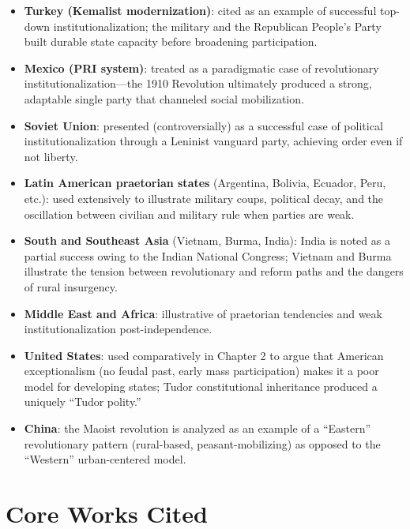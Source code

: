 \documentclass[12pt]{article}
\begin{document}
\begin{itemize}[leftmargin=*, itemsep=4pt]
    \item \textbf{Turkey (Kemalist modernization)}: cited as an example of successful top-down institutionalization; the military and the Republican People's Party built durable state capacity before broadening participation.
    \item \textbf{Mexico (PRI system)}: treated as a paradigmatic case of revolutionary institutionalization---the 1910 Revolution ultimately produced a strong, adaptable single party that channeled social mobilization.
    \item \textbf{Soviet Union}: presented (controversially) as a successful case of political institutionalization through a Leninist vanguard party, achieving order even if not liberty.
    \item \textbf{Latin American praetorian states} (Argentina, Bolivia, Ecuador, Peru, etc.): used extensively to illustrate military coups, political decay, and the oscillation between civilian and military rule when parties are weak.
    \item \textbf{South and Southeast Asia} (Vietnam, Burma, India): India is noted as a partial success owing to the Indian National Congress; Vietnam and Burma illustrate the tension between revolutionary and reform paths and the dangers of rural insurgency.
    \item \textbf{Middle East and Africa}: illustrative of praetorian tendencies and weak institutionalization post-independence.
    \item \textbf{United States}: used comparatively in Chapter 2 to argue that American exceptionalism (no feudal past, early mass participation) makes it a poor model for developing states; Tudor constitutional inheritance produced a uniquely ``Tudor polity.''
    \item \textbf{China}: the Maoist revolution is analyzed as an example of a ``Eastern'' revolutionary pattern (rural-based, peasant-mobilizing) as opposed to the ``Western'' urban-centered model.
\end{itemize}

\section{Core Works Cited}
\end{document}
